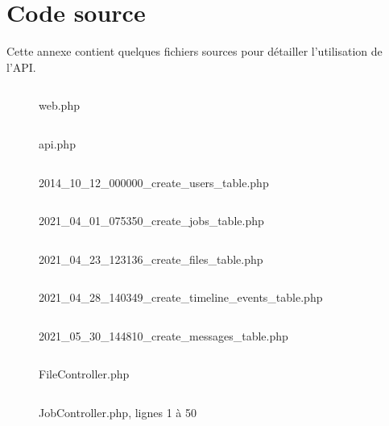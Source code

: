 \documentclass[
    iai, %
    eai, %
]{heig-tb}
\begin{document}
\appendix
\appendixpage
\addappheadtotoc

\chapter{Code source}
Cette annexe contient quelques fichiers sources pour détailler l'utilisation de l'API.

\begin{figure}[h]
  \inputminted[breaklines]{javascript}{assets/code/web.php}
  \caption{web.php}
\end{figure}
\newpage
\begin{figure}[h]
  \inputminted[breaklines]{javascript}{assets/code/api.php}
  \caption{api.php}
\end{figure}
\newpage
\begin{figure}[h]
  \inputminted[breaklines]{javascript}{assets/code/2014_10_12_000000_create_users_table.php}
  \caption{2014\_10\_12\_000000\_create\_users\_table.php}
\end{figure}
\newpage
\begin{figure}[h]
  \inputminted[breaklines]{javascript}{assets/code/2021_04_01_075350_create_jobs_table.php}
  \caption{2021\_04\_01\_075350\_create\_jobs\_table.php}
\end{figure}
\newpage
\begin{figure}[h]
  \inputminted[breaklines]{javascript}{assets/code/2021_04_23_123136_create_files_table.php}
  \caption{2021\_04\_23\_123136\_create\_files\_table.php}
\end{figure}
\newpage
\begin{figure}[h]
  \inputminted[breaklines]{javascript}{assets/code/2021_04_28_140349_create_timeline_events_table.php}
  \caption{2021\_04\_28\_140349\_create\_timeline\_events\_table.php}
\end{figure}
\newpage
\begin{figure}[h]
  \inputminted[breaklines]{javascript}{assets/code/2021_05_30_144810_create_messages_table.php}
  \caption{2021\_05\_30\_144810\_create\_messages\_table.php}
\end{figure}
\newpage
\begin{figure}[h]
  \inputminted[breaklines]{javascript}{assets/code/FileController.php}
  \caption{FileController.php}
\end{figure}
\newpage
\begin{figure}[h]
  \inputminted[breaklines, linenos , firstline=1, lastline=50]{javascript}{assets/code/JobController.php}
  \caption{JobController.php, lignes 1 à 50}
\end{figure}
\end{document}
